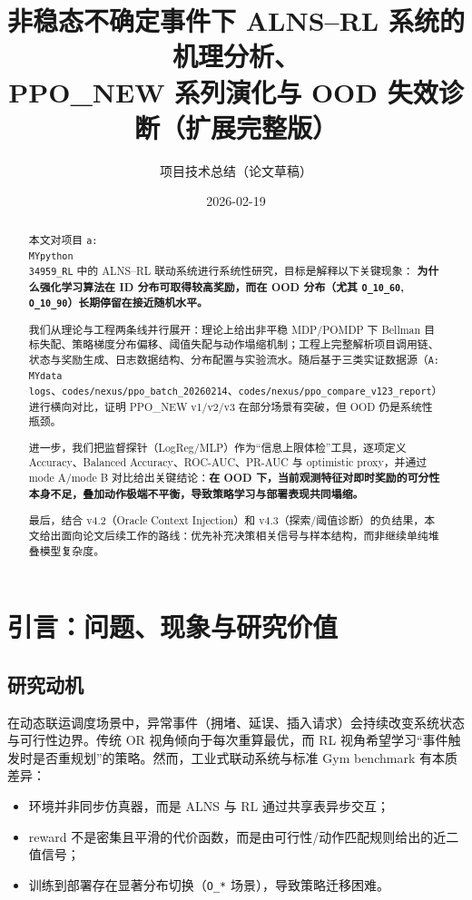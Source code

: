 ﻿\documentclass[11pt,a4paper]{ctexart}
\title{非稳态不确定事件下 ALNS--RL 系统的机理分析、\\PPO\_NEW 系列演化与 OOD 失效诊断（扩展完整版）}
\author{项目技术总结（论文草稿）}
\date{2026-02-19}
\begin{document}
\maketitle

\begin{abstract}
本文对项目 \texttt{a:\\MYpython\\34959\_RL} 中的 ALNS--RL 联动系统进行系统性研究，目标是解释以下关键现象：
\textbf{为什么强化学习算法在 ID 分布可取得较高奖励，而在 OOD 分布（尤其 \texttt{O\_10\_60}, \texttt{O\_10\_90}）长期停留在接近随机水平。}

我们从理论与工程两条线并行展开：理论上给出非平稳 MDP/POMDP 下 Bellman 目标失配、策略梯度分布偏移、阈值失配与动作塌缩机制；工程上完整解析项目调用链、状态与奖励生成、日志数据结构、分布配置与实验流水。随后基于三类实证数据源（\texttt{A:\\MYdata\\logs}、\texttt{codes/nexus/ppo\_batch\_20260214}、\texttt{codes/nexus/ppo\_compare\_v123\_report}）进行横向对比，证明 PPO\_NEW v1/v2/v3 在部分场景有突破，但 OOD 仍是系统性瓶颈。

进一步，我们把监督探针（LogReg/MLP）作为“信息上限体检”工具，逐项定义 Accuracy、Balanced Accuracy、ROC-AUC、PR-AUC 与 optimistic proxy，并通过 mode A/mode B 对比给出关键结论：\textbf{在 OOD 下，当前观测特征对即时奖励的可分性本身不足，叠加动作极端不平衡，导致策略学习与部署表现共同塌缩。}

最后，结合 v4.2（Oracle Context Injection）和 v4.3（探索/阈值诊断）的负结果，本文给出面向论文后续工作的路线：优先补充决策相关信号与样本结构，而非继续单纯堆叠模型复杂度。
\end{abstract}

\tableofcontents

\section{引言：问题、现象与研究价值}
\subsection{研究动机}
在动态联运调度场景中，异常事件（拥堵、延误、插入请求）会持续改变系统状态与可行性边界。传统 OR 视角倾向于每次重算最优，而 RL 视角希望学习“事件触发时是否重规划”的策略。然而，工业式联动系统与标准 Gym benchmark 有本质差异：
\begin{itemize}
  \item 环境并非同步仿真器，而是 ALNS 与 RL 通过共享表异步交互；
  \item reward 不是密集且平滑的代价函数，而是由可行性/动作匹配规则给出的近二值信号；
  \item 训练到部署存在显著分布切换（\texttt{O\_*} 场景），导致策略迁移困难。
\end{itemize}
\end{document}

